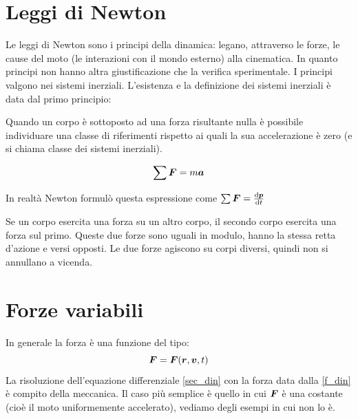 \section{Leggi di Newton}
Le leggi di Newton sono i principi della dinamica: legano, attraverso le forze, le cause del moto (le interazioni con il mondo esterno) alla cinematica. In quanto principi non hanno altra giustificazione che la verifica sperimentale. I principi valgono nei sistemi inerziali. L'esistenza e la definizione dei sistemi inerziali è data dal primo principio:
\begin{Pri}
  Quando un corpo è sottoposto ad una forza risultante nulla è
  possibile individuare una classe di riferimenti rispetto ai quali
  la sua accelerazione è zero (e si chiama classe dei sistemi inerziali).
\end{Pri}
\begin{Pri}
  \begin{equation}
    \sum\boldsymbol{F}=m\boldsymbol{a}
    \label{sec_din}
  \end{equation}
\end{Pri}
In realtà Newton formulò questa espressione come $\sum \boldsymbol{F}=\frac{\mathrm{d} \boldsymbol{p}}{\mathrm{d} t}$
\begin{Pri}
  Se un corpo esercita una forza su un altro corpo, il secondo corpo
  esercita una forza sul primo. Queste due forze sono uguali in
  modulo, hanno la stessa retta d'azione e versi opposti. Le due forze agiscono su corpi diversi, quindi non si annullano a vicenda.
\end{Pri}


\section{Forze variabili}
In generale la forza è una funzione del tipo:
\begin{equation}
  \boldsymbol{F}=\boldsymbol{F}(\boldsymbol{r},\boldsymbol{v},t)
  \label{f_din}
\end{equation}
La risoluzione dell'equazione differenziale \eqref{sec_din} con la forza data dalla \eqref{f_din} è compito della meccanica. Il caso più semplice è quello in cui $\boldsymbol{F}$ è una costante (cioè il moto uniformemente accelerato), vediamo degli esempi in cui non lo è.

